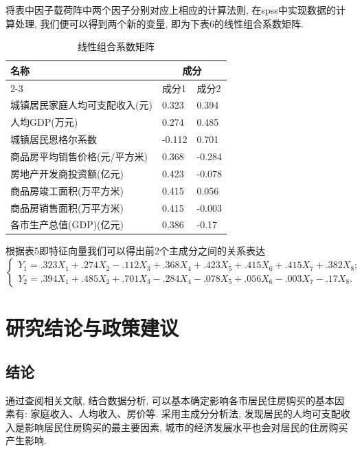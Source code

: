 \documentclass[a4paper, 12pt, twoside]{ctexart}
\renewcommand\arraystretch{1}
\begin{document}
将表中因子载荷阵中两个因子分别对应上相应的计算法则, 在spss中实现数据的计算处理, 我们便可以得到两个新的变量, 即为下表6的线性组合系数矩阵.

\begin{table}[H]
    \centering
    \renewcommand\arraystretch{.9}
    \caption{线性组合系数矩阵}\medskip    {}
    \begin{tabular}{m{15\ccwd}<{\centering}m{4\ccwd}<{\centering} m{4\ccwd}<{\centering}}
        \toprule
        \multirow{2}{*}{名称} & \multicolumn{2}{c}{成分} \\
        \cmidrule{2-3}	
        &  成分1 &	成分2 \\
        \midrule
        城镇居民家庭人均可支配收入(元) &	0.323 &	0.394 \\
        人均GDP(万元) &	0.274 &	0.485 \\
        城镇居民恩格尔系数 &	-0.112 &	0.701 \\
        商品房平均销售价格(元/平方米) &	0.368 &	-0.284 \\
        房地产开发商投资额(亿元) &	0.423 &	-0.078 \\
        商品房竣工面积(万平方米) &	0.415 &	0.056 \\
        商品房销售面积(万平方米) &	0.415 &	-0.003 \\
        各市生产总值(GDP)(亿元) &	0.386 &	-0.17 \\
        \bottomrule
    \end{tabular}
\end{table}

根据表5即特征向量我们可以得出前2个主成分之间的关系表达
    $$\begin{cases}
        Y_1=. 323 X_1+. 274 X_2-. 112 X_3+. 368 X_4+. 423X_5+. 415X_6+. 415X_7+. 382X_8; \\[-5pt]
        Y_2=. 394 X_1+. 485 X_2+. 701 X_3-. 284 X_4-. 078X_5+. 056X_6-. 003X_7-. 17X_8.
        \end{cases}$$


\section{研究结论与政策建议}
 \subsection{结论}通过查阅相关文献, 结合数据分析, 可以基本确定影响各市居民住房购买的基本因素有: 家庭收入、人均收入、房价等. 采用主成分分析法, 发现居民的人均可支配收入是影响居民住房购买的最主要因素, 城市的经济发展水平也会对居民的住房购买产生影响.
\end{document}
